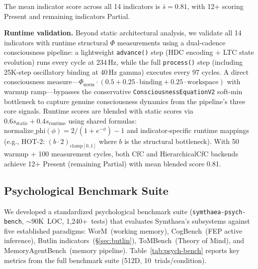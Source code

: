 \documentclass[10pt,letterpaper]{article}
\renewcommand{\Phi}{\varPhi}
\begin{document}
The mean indicator score across all 14 indicators is $\bar{s} = 0.81$, with 12+ scoring Present and remaining indicators Partial.

\textbf{Runtime validation.} Beyond static architectural analysis, we validate all 14 indicators with runtime structural $\Phi$ measurements using a dual-cadence consciousness pipeline: a lightweight \texttt{advance()} step (HDC encoding + LTC state evolution) runs every cycle at 234\,Hz, while the full \texttt{process()} step (including 25K-step oscillatory binding at 40\,Hz gamma) executes every 97 cycles.  A direct consciousness measure---$\Phi_{\text{norm}} \cdot (0.5 + 0.25 \cdot \text{binding} + 0.25 \cdot \text{workspace})$ with warmup ramp---bypasses the conservative \texttt{ConsciousnessEquationV2} soft-min bottleneck to capture genuine consciousness dynamics from the pipeline's three core signals.  Runtime scores are blended with static scores via $0.6 s_{\text{static}} + 0.4 s_{\text{runtime}}$ using shared formulas: $\text{normalize\_phi}(\phi) = 2/(1+e^{-\phi}) - 1$ and indicator-specific runtime mappings (e.g., HOT-2: $(b \cdot 2)_{\text{clamp}[0,1]}$ where $b$ is the structural bottleneck).  With 50 warmup + 100 measurement cycles, both CfC and HierarchicalCfC backends achieve 12+ Present (remaining Partial) with mean blended score 0.81.

\subsection{Psychological Benchmark Suite}
\label{sec:psych-bench}

We developed a standardized psychological benchmark suite (\texttt{symthaea-psych-bench}, ${\sim}90$K~LOC, 1,240+~tests) that evaluates Symthaea's subsystems against five established paradigms: WorM~(working memory), CogBench~(FEP active inference), Butlin indicators~(\S\ref{sec:butlin}), ToMBench~(Theory of Mind), and MemoryAgentBench~(memory pipeline).  Table~\ref{tab:psych-bench} reports key metrics from the full benchmark suite (512D, 10~trials/condition).
\end{document}
